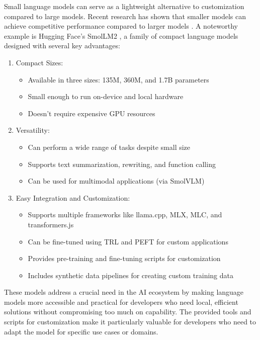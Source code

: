 Small language models can serve as a lightweight alternative to customization compared to large models. Recent research has shown that smaller models can achieve competitive performance compared to larger models . A noteworthy example is Hugging Face's SmolLM2 , a family of compact language models designed with several key advantages:

\begin{enumerate}
\item Compact Sizes:
\begin{itemize}
    \item Available in three sizes: 135M, 360M, and 1.7B parameters
    \item Small enough to run on-device and local hardware
    \item Doesn't require expensive GPU resources
\end{itemize}

\item Versatility:
\begin{itemize}
    \item Can perform a wide range of tasks despite small size
    \item Supports text summarization, rewriting, and function calling
    \item Can be used for multimodal applications (via SmolVLM)
\end{itemize}

\item Easy Integration and Customization:
\begin{itemize}
    \item Supports multiple frameworks like llama.cpp, MLX, MLC, and transformers.js
    \item Can be fine-tuned using TRL and PEFT for custom applications
    \item Provides pre-training and fine-tuning scripts for customization
    \item Includes synthetic data pipelines for creating custom training data
\end{itemize}
\end{enumerate}

These models address a crucial need in the AI ecosystem by making language models more accessible and practical for developers who need local, efficient solutions without compromising too much on capability. The provided tools and scripts for customization make it particularly valuable for developers who need to adapt the model for specific use cases or domains.

